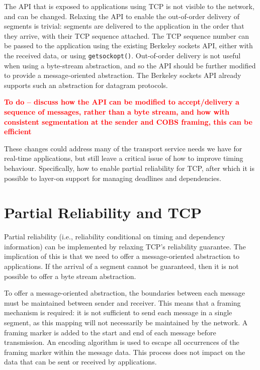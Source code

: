 \documentclass[10pt]{sig-alternate-05-2015}
\newcommand{\todo}[1]{\textbf{\textcolor{red}{To do -- #1}}}
\begin{document}
The API that is exposed to applications using TCP is not visible to the
network, and can be changed. Relaxing the API to enable the out-of-order
delivery of segments is trivial: segments are delivered to the application
in the order that they arrive, with their TCP sequence attached. The TCP
sequence number can be passed to the application using the existing
Berkeley sockets API, either with the received data, or using
\texttt{getsockopt()}. Out-of-order delivery is not useful when using a
byte-stream abstraction, and so the API should be further modified to
provide a message-oriented abstraction. The Berkeley sockets API already
supports such an abstraction for datagram protocols.

\todo{discuss how the API can be modified to accept/delivery a sequence
      of messages, rather than a byte stream, and how with consistent
      segmentation at the sender and COBS framing, this can be efficient}

These changes could address many of the transport service needs we have for
real-time applications, but still leave a critical issue of how to improve
timing behaviour. Specifically, how to enable partial reliability for TCP,
after which it is possible to layer-on support for managing deadlines and
dependencies.

\section{Partial Reliability and TCP}
\label{sec:partial}

Partial reliability (i.e., reliability conditional on timing and dependency
information) can be implemented by relaxing TCP's reliability guarantee.
The implication of this is that we need to offer a message-oriented
abstraction to applications. If the arrival of a segment cannot be
guaranteed, then it is not possible to offer a byte stream abstraction.

To offer a message-oriented abstraction, the boundaries between each
message must be maintained between sender and receiver. This means that a
framing mechanism is required: it is not sufficient to send each message in
a single segment, as this mapping will not necessarily be maintained by the
network. A framing marker is added to the start and end of each message
before transmission. An encoding algorithm is used to escape all occurrences
of the framing marker within the message data. This process does not impact
on the data that can be sent or received by applications.
\end{document}
